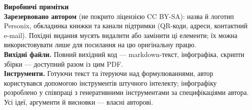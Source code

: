 \clearpage
\thispagestyle{empty}
\begin{flushleft}\small\sffamily
\textbf{Виробничі примітки}\\[1.2em]

\textbf{Зарезервовано автором} (не покрито ліцензією CC BY-SA): назва й
логотип Personix, обкладинка книжки та канали підтримки (QR-коди, адреси,
контактний e-mail). Похідні видання мусять видалити або замінити ці елементи;
їх можна використовувати лише для посилання на цю оригінальну працю.\\[1.2em]

\textbf{Вихідні файли.} Повний вихідний код --- markdown-текст, інфографіка,
скрипти збірки --- доступний разом із цим PDF.\\[1.2em]

\textbf{Інструменти.} Готуючи текст та ітеруючи над формулюваннями, автор
користувався допомогою інструментів штучного інтелекту; інфографіку розроблено
у співпраці з генеративними інструментами за специфікаціями автора.
Усі ідеї, аргументи й висновки --- власні авторові.
\end{flushleft}
\clearpage
